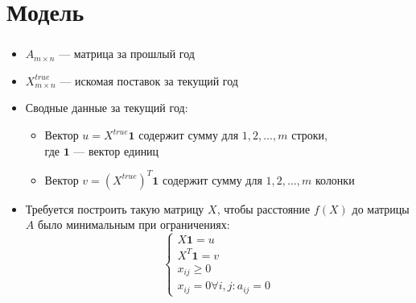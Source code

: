 \documentclass{beamer}
\begin{document}
\section{Модель}
\begin{frame}
	\frametitle{\insertsection}
	
	\begin{itemize}
	\item $A_{m\times n}$ — матрица за прошлый год
	\item $X^{true}_{m\times n}$ — искомая поставок за текущий год
	\item Сводные данные за текущий год:
	\begin{itemize}
	\item Вектор $u = X^{true} \mathbf 1$ содержит сумму для $1, 2, \dots, m$ строки, \\ где $\mathbf 1$ — вектор единиц
	\item Вектор $v = (X^{true})^T \mathbf 1$ содержит сумму для $1, 2, \dots, m$ колонки
	\end{itemize}
	\item Требуется построить такую матрицу $X$, чтобы расстояние $f(X)$ до матрицы $A$ было минимальным при ограничениях: 	$$\begin{cases}
	X\mathbf 1 = u \\
	X^T\mathbf 1 = v \\
	x_{ij} \geq 0 \\
	x_{ij} = 0 \forall i,j:a_{ij} = 0
	\end{cases}$$
	\end{itemize}

\end{frame}
\end{document}
